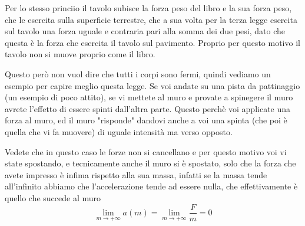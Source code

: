 \documentclass{rapport}
\begin{document}
\begin{center}
\end{center}

Per lo stesso princiio il tavolo subisce la forza peso del libro e la sua forza peso, che le esercita sulla superficie terrestre, che a sua volta per la terza legge  esercita sul tavolo una forza uguale e contraria pari alla somma dei due pesi, dato che questa è la forza che esercita il tavolo sul pavimento. Proprio per questo motivo il tavolo non si muove proprio come il libro.

Questo però non vuol dire che tutti i corpi sono fermi, quindi vediamo un esempio per capire meglio questa legge. Se voi andate su una pista da pattinaggio (un esempio di poco attito), se vi mettete al muro e provate a spinegere il muro avrete l'effetto di essere spinti dall'altra parte. Questo perchè voi applicate una forza al muro, ed il muro "risponde" dandovi anche a voi una spinta (che poi è quella che vi fa muovere) di uguale intensità ma verso opposto. 

Vedete che in questo caso le forze non si cancellano e per questo motivo voi vi state spostando, e tecnicamente anche il muro si è spostato, solo che la forza che avete impresso è infima rispetto alla sua massa, infatti se la massa tende all'infinito abbiamo che l'accelerazione tende ad essere nulla, che effettivamente è quello che succede al muro
\[
\lim_{m \to +\infty} a(m) = \lim_{m \to +\infty}  \dfrac{F}{m} = 0 
\]
\end{document}
